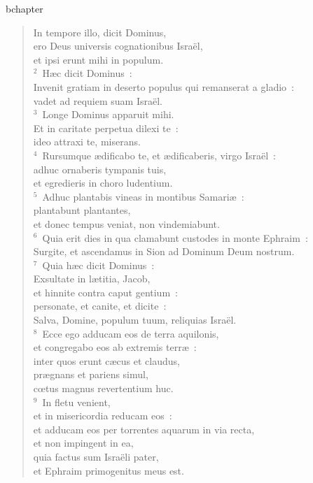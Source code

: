 bchapter\begin{flushleft}\begin{verse}\vspace{-19pt}\hspace{6pt}In tempore illo, dicit Dominus,\\\hspace{6pt} ero Deus universis cognationibus Isra\"el,\\ et ipsi erunt mihi in populum.\\
${}^{2}$~H\ae c dicit Dominus~:\\ Invenit gratiam in deserto populus qui remanserat a gladio~:\\ vadet ad requiem suam Isra\"el.\\
${}^{3}$~Longe Dominus apparuit mihi.\\ Et in caritate perpetua dilexi te~:\\ ideo attraxi te, miserans.\\
${}^{4}$~Rursumque \ae dificabo te, et \ae dificaberis, virgo Isra\"el~:\\ adhuc ornaberis tympanis tuis,\\ et egredieris in choro ludentium.\\
${}^{5}$~Adhuc plantabis vineas in montibus Samari\ae~:\\ plantabunt plantantes,\\ et donec tempus veniat, non vindemiabunt.\\
${}^{6}$~Quia erit dies in qua clamabunt custodes in monte Ephraim~:\\ Surgite, et ascendamus in Sion ad Dominum Deum nostrum.\\
${}^{7}$~Quia h\ae c dicit Dominus~:\\ Exsultate in l\ae titia, Jacob,\\ et hinnite contra caput gentium~:\\ personate, et canite, et dicite~:\\ Salva, Domine, populum tuum, reliquias Isra\"el.\\
${}^{8}$~Ecce ego adducam eos de terra aquilonis,\\ et congregabo eos ab extremis terr\ae~:\\ inter quos erunt c\ae cus et claudus,\\ pr\ae gnans et pariens simul,\\ cœtus magnus revertentium huc.\\
${}^{9}$~In fletu venient,\\ et in misericordia reducam eos~:\\ et adducam eos per torrentes aquarum in via recta,\\ et non impingent in ea,\\ quia factus sum Isra\"eli pater,\\ et Ephraim primogenitus meus est.\\

\end{verse}
\end{flushleft}
